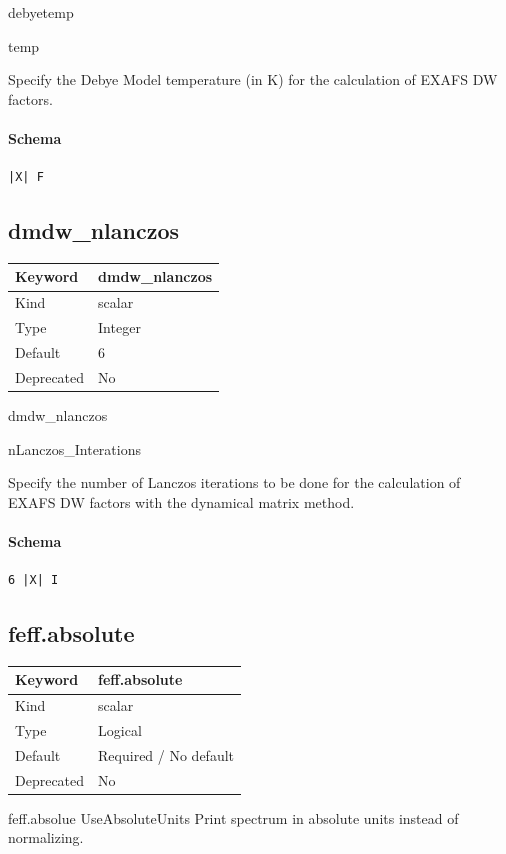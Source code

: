 \documentclass[11pt]{article}
\begin{document}
 debyetemp
 {
 temp

 Specify the Debye Model temperature (in K) for the calculation of EXAFS DW
 factors.

\paragraph{Schema}
\begin{Verbatim}
|X| F
\end{Verbatim}

\subsection{dmdw\_nlanczos}
\label{kw:dmdw-nlanczos}
\begin{longtable}{|p{1.5in}|p{4.5in}|}
\hline
Keyword & dmdw\_nlanczos \\
\hline
Kind & scalar \\
\hline
Type & Integer \\
\hline
Default & 6 \\
\hline
Deprecated & No \\
\hline
\end{longtable}

 dmdw\_nlanczos
 {
 nLanczos\_Interations

 Specify the number of Lanczos iterations to be done for the calculation of
 EXAFS DW factors with the dynamical matrix method.

\paragraph{Schema}
\begin{Verbatim}
6 |X| I
\end{Verbatim}

\subsection{feff.absolute}
\label{kw:feff-absolute}
\begin{longtable}{|p{1.5in}|p{4.5in}|}
\hline
Keyword & feff.absolute \\
\hline
Kind & scalar \\
\hline
Type & Logical \\
\hline
Default & Required / No default \\
\hline
Deprecated & No \\
\hline
\end{longtable}
 feff.absolue{ UseAbsoluteUnits }
 Print spectrum in absolute units instead of normalizing.

}}
\end{document}
